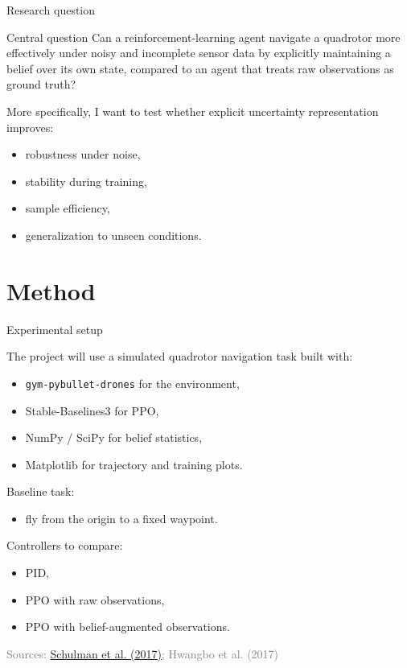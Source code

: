 \documentclass[11pt]{beamer}
\newcommand{\srcSchulman}{\href{https://arxiv.org/abs/1707.06347}{Schulman et al. (2017)}}
\newcommand{\srcHwangbo}{Hwangbo et al. (2017)}
\newcommand{\SourceLine}[1]{\vfill{\tiny\textcolor{gray}{Sources: #1}}}
\begin{document}

\begin{frame}{Research question}

\begin{block}{Central question}
Can a reinforcement-learning agent navigate a quadrotor more effectively under noisy and incomplete sensor data by explicitly maintaining a belief over its own state, compared to an agent that treats raw observations as ground truth?
\end{block}

\medskip
More specifically, I want to test whether explicit uncertainty representation improves:
\begin{itemize}
  \item robustness under noise,
  \item stability during training,
  \item sample efficiency,
  \item generalization to unseen conditions.
\end{itemize}
\end{frame}


\section{Method}


\begin{frame}{Experimental setup}

The project will use a simulated quadrotor navigation task built with:
\begin{itemize}
  \item \texttt{gym-pybullet-drones} for the environment,
  \item Stable-Baselines3 for PPO,
  \item NumPy / SciPy for belief statistics,
  \item Matplotlib for trajectory and training plots.
\end{itemize}

\medskip
Baseline task:
\begin{itemize}
  \item fly from the origin to a fixed waypoint.
\end{itemize}

Controllers to compare:
\begin{itemize}
  \item PID,
  \item PPO with raw observations,
  \item PPO with belief-augmented observations.
\end{itemize}

\SourceLine{\srcSchulman; \srcHwangbo}
\end{frame}
\end{document}
